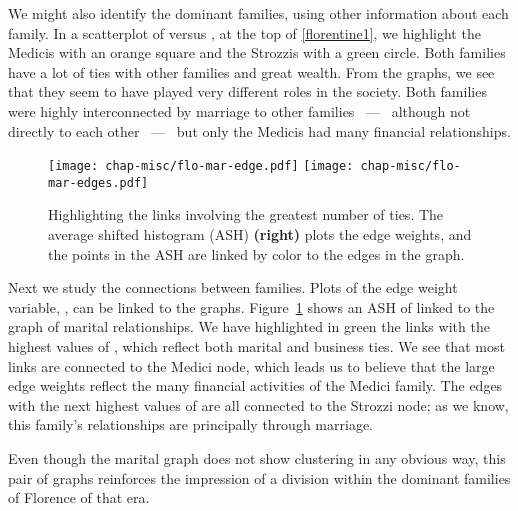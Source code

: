 We might also identify the dominant families, using other information
about each family.  In a scatterplot of  versus
, at the top of \ref{florentine1}, we highlight the
Medicis with an orange square and the Strozzis with a green circle.
Both families have a lot of ties with other families and great wealth.
From the graphs, we see that they seem to have played very different
roles in the society.  Both families were highly interconnected by
marriage to other families ~---~ although not directly to each other
~---~ but only the Medicis had many financial relationships.

\begin{figure}[htbp]
\centerline{
  \texttt{[image: chap-misc/flo-mar-edge.pdf]}
  \texttt{[image: chap-misc/flo-mar-edges.pdf]}
}
\caption[Highlighting the links involving the greatest number of
ties]{Highlighting the links involving the greatest number of ties.
The average shifted histogram (ASH) {\bf (right)} plots the edge
weights, and the points in the ASH are linked by color to the edges in
the graph.}
\label{florentine2}
\end{figure}

Next we study the connections between families. Plots of the edge
weight variable, , can be linked to the
graphs. Figure~\ref{florentine2} shows an ASH of  linked
to the graph of marital relationships.  We have highlighted in green
the links with the highest values of , which reflect
both marital and business ties.  We see that most links are connected
to the Medici node, which leads us to believe that the large edge
weights reflect the many financial activities of the Medici family.
The edges with the next highest values of  are all
connected to the Strozzi node; as we know, this family's
relationships are principally through marriage.  

Even though the marital graph does not show clustering in any obvious
way, this pair of graphs reinforces the impression of a division
within the dominant families of Florence of that era.



